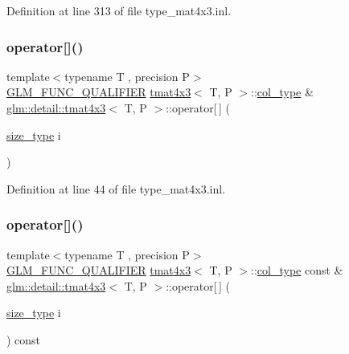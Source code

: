 Definition at line 313 of file type\+\_\+mat4x3.\+inl.

\mbox{\label{structglm_1_1detail_1_1tmat4x3_a7c0a9a47c01b37d13ac412b24300c16a}} 
\subsubsection{\texorpdfstring{operator[]()}{operator[]()}\hspace{0.1cm}{\footnotesize\ttfamily [1/2]}}
{\footnotesize\ttfamily template$<$typename T , precision P$>$ \\
\hyperlink{setup_8hpp_a33fdea6f91c5f834105f7415e2a64407}{G\+L\+M\+\_\+\+F\+U\+N\+C\+\_\+\+Q\+U\+A\+L\+I\+F\+I\+ER} \hyperlink{structglm_1_1detail_1_1tmat4x3}{tmat4x3}$<$ T, P $>$\+::\hyperlink{structglm_1_1detail_1_1tmat4x3_a58afd510f7ab968e5a86e20f2f3979de}{col\+\_\+type} \& \hyperlink{structglm_1_1detail_1_1tmat4x3}{glm\+::detail\+::tmat4x3}$<$ T, P $>$\+::operator\mbox{[}$\,$\mbox{]} (\begin{DoxyParamCaption}\item[{\hyperlink{structglm_1_1detail_1_1tmat4x3_aceab433265627d5787fe291463d19b91}{size\+\_\+type}}]{i }\end{DoxyParamCaption})}



Definition at line 44 of file type\+\_\+mat4x3.\+inl.

\mbox{\label{structglm_1_1detail_1_1tmat4x3_a88f08d3121322921c25282c8983edfbf}} 
\subsubsection{\texorpdfstring{operator[]()}{operator[]()}\hspace{0.1cm}{\footnotesize\ttfamily [2/2]}}
{\footnotesize\ttfamily template$<$typename T , precision P$>$ \\
\hyperlink{setup_8hpp_a33fdea6f91c5f834105f7415e2a64407}{G\+L\+M\+\_\+\+F\+U\+N\+C\+\_\+\+Q\+U\+A\+L\+I\+F\+I\+ER} \hyperlink{structglm_1_1detail_1_1tmat4x3}{tmat4x3}$<$ T, P $>$\+::\hyperlink{structglm_1_1detail_1_1tmat4x3_a58afd510f7ab968e5a86e20f2f3979de}{col\+\_\+type} const  \& \hyperlink{structglm_1_1detail_1_1tmat4x3}{glm\+::detail\+::tmat4x3}$<$ T, P $>$\+::operator\mbox{[}$\,$\mbox{]} (\begin{DoxyParamCaption}\item[{\hyperlink{structglm_1_1detail_1_1tmat4x3_aceab433265627d5787fe291463d19b91}{size\+\_\+type}}]{i }\end{DoxyParamCaption}) const}



